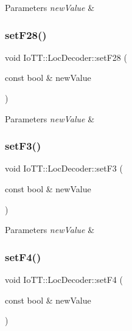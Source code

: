 \begin{DoxyParams}{Parameters}
{\em new\+Value} & \\
\hline
\end{DoxyParams}
\mbox{\label{classIoTT_1_1LocDecoder_a082ff7e341958add6a0367c989c58d0a}} 
\subsubsection{\texorpdfstring{set\+F28()}{setF28()}}
{\footnotesize\ttfamily void Io\+T\+T\+::\+Loc\+Decoder\+::set\+F28 (\begin{DoxyParamCaption}\item[{const bool \&}]{new\+Value }\end{DoxyParamCaption})}


\begin{DoxyParams}{Parameters}
{\em new\+Value} & \\
\hline
\end{DoxyParams}
\mbox{\label{classIoTT_1_1LocDecoder_aa76fd0ad9d6ab28805d3f2a1a97fab4c}} 
\subsubsection{\texorpdfstring{set\+F3()}{setF3()}}
{\footnotesize\ttfamily void Io\+T\+T\+::\+Loc\+Decoder\+::set\+F3 (\begin{DoxyParamCaption}\item[{const bool \&}]{new\+Value }\end{DoxyParamCaption})}


\begin{DoxyParams}{Parameters}
{\em new\+Value} & \\
\hline
\end{DoxyParams}
\mbox{\label{classIoTT_1_1LocDecoder_a5eb0fc4661df614b298d8e54934559f0}} 
\subsubsection{\texorpdfstring{set\+F4()}{setF4()}}
{\footnotesize\ttfamily void Io\+T\+T\+::\+Loc\+Decoder\+::set\+F4 (\begin{DoxyParamCaption}\item[{const bool \&}]{new\+Value }\end{DoxyParamCaption})}


